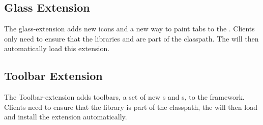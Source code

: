 \subsection{Glass Extension}
The glass-extension adds new icons and a new way to paint tabs to the \linebreak {}. Clients only need to ensure that the libraries \linebreak {} and  are part of the classpath. The  will then automatically load this extension.


\subsection{Toolbar Extension}
The Toolbar-extension adds toolbars, a set of new s and s, to the framework. Clients need to ensure that the library \linebreak {} is part of the classpath, the \linebreak {} will then load and install the extension automatically.

